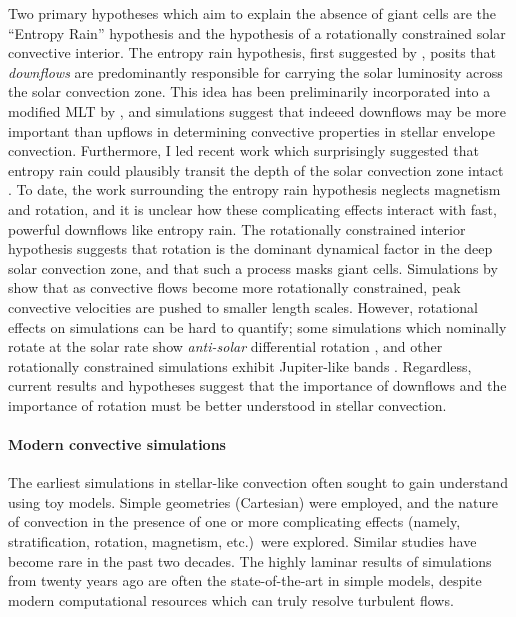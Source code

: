 \documentclass[11pt, preprint]{aastex}
\begin{document}
Two primary hypotheses which aim to explain the absence of giant cells are the ``Entropy Rain'' hypothesis and the hypothesis of a rotationally constrained solar convective interior.
The entropy rain hypothesis, first suggested by \citet{spruit1997}, posits that \emph{downflows} are predominantly responsible for carrying the solar luminosity across the solar convection zone.
This idea has been preliminarily incorporated into a modified MLT by \citet{brandenburg2016}, and simulations \citep{kapyla&all2017} suggest that indeeed downflows may be more important than upflows in determining convective properties in stellar envelope convection.
Furthermore, I led recent work which surprisingly suggested that entropy rain could plausibly transit the depth of the solar convection zone intact \citep{andersLB2019}.
To date, the work surrounding the entropy rain hypothesis neglects magnetism and rotation, and it is unclear how these complicating effects interact with fast, powerful downflows like entropy rain.
The rotationally constrained interior hypothesis suggests that rotation is the dominant dynamical factor in the deep solar convection zone, and that such a process masks giant cells.
Simulations by \citet{featherstone&hindman2016} show that as convective flows become more rotationally constrained, peak convective velocities are pushed to smaller length scales.
However, rotational effects on simulations can be hard to quantify; some simulations which nominally rotate at the solar rate show \emph{anti-solar} differential rotation \citep{gastine&all2014}, and other rotationally constrained simulations exhibit Jupiter-like bands \citep{brun&all2017}.
Regardless, current results and hypotheses suggest that the importance of downflows and the importance of rotation must be better understood in stellar convection.

\paragraph{Modern convective simulations}
\label{sct:modern_simulations}
The earliest simulations in stellar-like convection \citep{graham1975, hurlburt&all1984, cattaneo&all1991, brummell&all1996, brummell&all1998} often sought to gain understand using toy models.
Simple geometries (Cartesian) were employed, and the nature of convection in the presence of one or more complicating effects (namely, stratification, rotation, magnetism, etc.)~were explored.
Similar studies \citep[e.g.,][]{wood&brummell2012, anders&brown2017, wood&brummell2018} have become rare in the past two decades.
The highly laminar results of simulations from twenty years ago are often the state-of-the-art in simple models, despite modern computational resources which can truly resolve turbulent flows.
\end{document}
